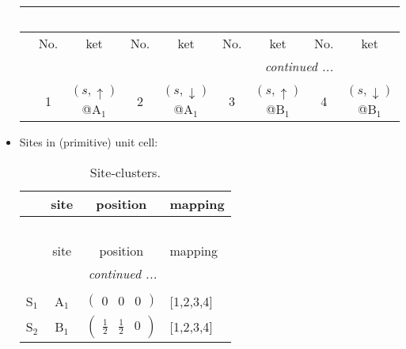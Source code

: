 \documentclass[fleqn,10pt,landscape]{article}
\begin{document}
\begin{itemize}
\begin{center}
\begin{longtable}{c|cc|cc|cc|cc}
\multicolumn{8}{l}{\tablename\ \thetable{}} \\
 \hline \hline
 & No. & ket & No. & ket & No. & ket & No. & ket \\ \hline \endhead

 \hline \hline
\multicolumn{8}{r}{\footnotesize\it continued ...} \\ \endfoot

 \hline \hline
\multicolumn{8}{r}{} \\ \endlastfoot

 & 1 & $(s,\uparrow)$@A$_{1}$ & 2 & $(s,\downarrow)$@A$_{1}$ & 3 & $(s,\uparrow)$@B$_{1}$ & 4 & $(s,\downarrow)$@B$_{1}$ \\
\end{longtable}
\end{center}

\item Sites in (primitive) unit cell:
\begin{center}
\renewcommand{\arraystretch}{1.3}
\begin{longtable}{cc|c|l}
\caption{Site-clusters.}
 \\
 \hline \hline
 & site & position & mapping \\ \hline \endfirsthead

\multicolumn{3}{l}{\tablename\ \thetable{}} \\
 \hline \hline
 & site & position & mapping \\ \hline \endhead

 \hline \hline
\multicolumn{3}{r}{\footnotesize\it continued ...} \\ \endfoot

 \hline \hline
\multicolumn{3}{r}{} \\ \endlastfoot

S$_{1}$ & A$_1$ & $\begin{pmatrix} 0 & 0 & 0 \end{pmatrix}$ & [1,2,3,4] \\ \hline
S$_{2}$ & B$_1$ & $\begin{pmatrix} \frac{1}{2} & \frac{1}{2} & 0 \end{pmatrix}$ & [1,2,3,4] \\
\end{longtable}
\end{center}


\end{itemize}
\end{document}
